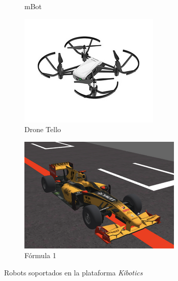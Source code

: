 \begin{figure}[h!]
\begin{subfigure}[b]{0.2\textwidth}
    \caption{mBot}
  \end{subfigure}
    \hfill
  \begin{subfigure}[b]{0.2\textwidth}
    \includegraphics[width=\textwidth, height=\textwidth]{tello_2.png}
    \caption{Drone Tello}
  \end{subfigure}
    \hfill
  \begin{subfigure}[b]{0.2\textwidth}
    \includegraphics[width=\textwidth, height=\textwidth]{f1.png}
    \caption{Fórmula 1}
  \end{subfigure}
\caption{Robots soportados en la plataforma \textit{Kibotics}}
\label{fig:RobotsKibotics}
\end{figure}


